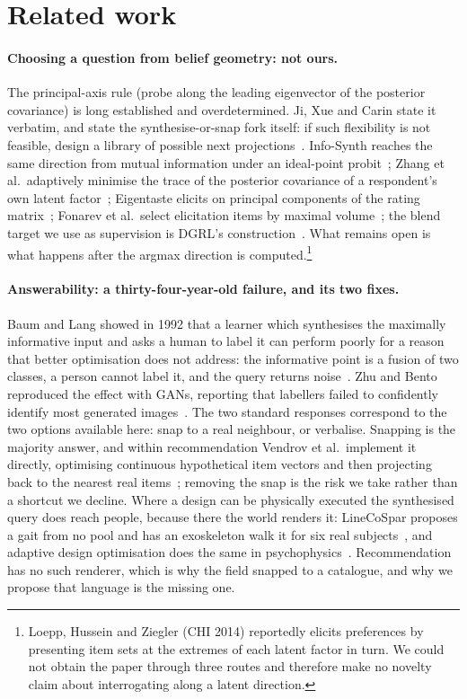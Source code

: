 \documentclass[11pt]{article}
\begin{document}
\section{Related work}
\label{sec:related}

\paragraph{Choosing a question from belief geometry: not ours.} The principal-axis rule (probe along
the leading eigenvector of the posterior covariance) is long established and overdetermined. Ji, Xue
and Carin state it verbatim, and state the synthesise-or-snap fork itself: if such flexibility is not
feasible, design a library of possible next projections~\cite{ji2008bcs}. Info-Synth reaches the same
direction from mutual information under an ideal-point probit~\cite{nadagouda2026infosynth}; Zhang et
al.\ adaptively minimise the trace of the posterior covariance of a respondent's own latent
factor~\cite{zhang2020activemf}; Eigentaste elicits on principal components of the rating
matrix~\cite{goldberg2001eigentaste}; Fonarev et al.\ select elicitation items by maximal
volume~\cite{fonarev2016rectangular}; the blend target we use as supervision is DGRL's
construction~\cite{hoppe2026dgrl}. What remains open is what happens after the argmax direction is
computed.\footnote{Loepp, Hussein and Ziegler (CHI 2014) reportedly elicits preferences by presenting
item sets at the extremes of each latent factor in turn. We could not obtain the paper through three
routes and therefore make no novelty claim about interrogating along a latent direction.}

\paragraph{Answerability: a thirty-four-year-old failure, and its two fixes.} Baum and Lang showed in
1992 that a learner which synthesises the maximally informative input and asks a human to label it
can perform poorly for a reason that better optimisation does not address: the informative point is a
fusion of two classes, a person cannot label it, and the query returns noise~\cite{baum1992query}.
Zhu and Bento reproduced the effect with GANs, reporting that labellers failed to confidently identify
most generated images~\cite{zhu2017gaal}. The two standard responses correspond to the two options
available here: snap to a real neighbour, or verbalise. Snapping is the majority answer, and within
recommendation Vendrov et al.\ implement it directly, optimising continuous hypothetical item vectors
and then projecting back to the nearest real items~\cite{vendrov2020gradient}; removing the snap is
the risk we take rather than a shortcut we decline. Where a design can be physically executed the
synthesised query does reach people, because there the world renders it: LineCoSpar proposes a gait
from no pool and has an exoskeleton walk it for six real subjects~\cite{tucker2020linecospar}, and
adaptive design optimisation does the same in psychophysics~\cite{ahn2020ado}. Recommendation has no
such renderer, which is why the field snapped to a catalogue, and why we propose that language is the
missing one.
\end{document}
